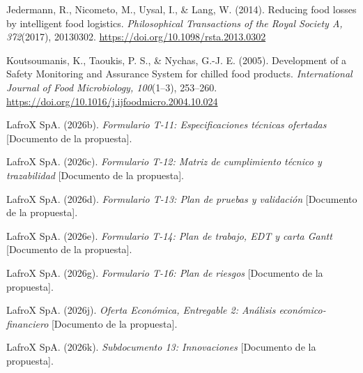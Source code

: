 \begin{list}{}{\setlength{\leftmargin}{1.27cm}\setlength{\itemindent}{-1.27cm}\setlength{\itemsep}{0.4em}\setlength{\parsep}{0pt}}
  \item Jedermann, R., Nicometo, M., Uysal, I., \& Lang, W. (2014). Reducing food losses by intelligent food logistics. \emph{Philosophical Transactions of the Royal Society A, 372}(2017), 20130302. \url{https://doi.org/10.1098/rsta.2013.0302}
  \item Koutsoumanis, K., Taoukis, P. S., \& Nychas, G.-J. E. (2005). Development of a Safety Monitoring and Assurance System for chilled food products. \emph{International Journal of Food Microbiology, 100}(1–3), 253–260. \url{https://doi.org/10.1016/j.ijfoodmicro.2004.10.024}
  \item \begin{samepage}LafroX SpA. (2026b). \emph{Formulario T-11: Especificaciones técnicas ofertadas} [Documento de la propuesta].\par\end{samepage}
  \item \begin{samepage}LafroX SpA. (2026c). \emph{Formulario T-12: Matriz de cumplimiento técnico y trazabilidad} [Documento de la propuesta].\par\end{samepage}
  \item \begin{samepage}LafroX SpA. (2026d). \emph{Formulario T-13: Plan de pruebas y validación} [Documento de la propuesta].\par\end{samepage}
  \item \begin{samepage}LafroX SpA. (2026e). \emph{Formulario T-14: Plan de trabajo, EDT y carta Gantt} [Documento de la propuesta].\par\end{samepage}
  \item \begin{samepage}LafroX SpA. (2026g). \emph{Formulario T-16: Plan de riesgos} [Documento de la propuesta].\par\end{samepage}
  \item \begin{samepage}LafroX SpA. (2026j). \emph{Oferta Económica, Entregable 2: Análisis económico-financiero} [Documento de la propuesta].\par\end{samepage}
  \item \begin{samepage}LafroX SpA. (2026k). \emph{Subdocumento 13: Innovaciones} [Documento de la propuesta].\par\end{samepage}

\end{list}
